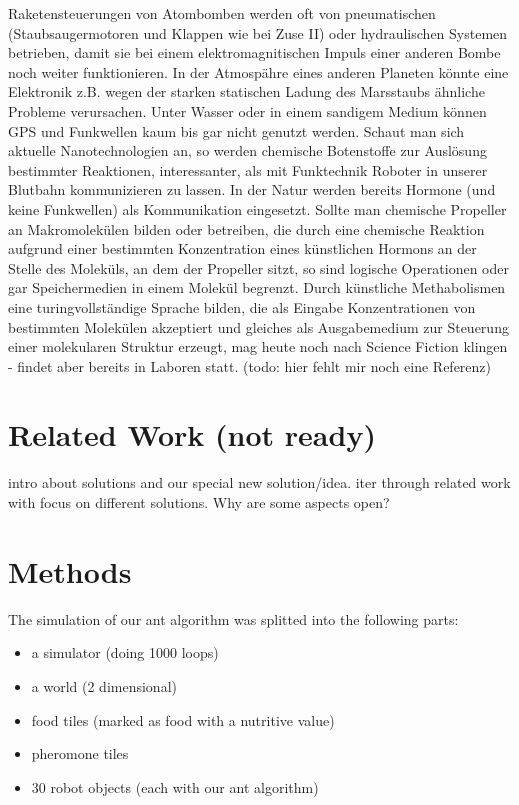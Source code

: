 Raketensteuerungen von Atombomben werden oft von pneumatischen
(Staubsaugermotoren und Klappen wie bei Zuse II) oder hydraulischen
Systemen betrieben, damit sie bei einem elektromagnitischen Impuls einer
anderen Bombe noch weiter funktionieren. In der Atmospähre eines anderen
Planeten könnte eine Elektronik z.B. wegen der starken statischen Ladung
des Marsstaubs ähnliche Probleme verursachen. Unter Wasser oder in einem
sandigem Medium können GPS und Funkwellen kaum bis gar nicht genutzt
werden. Schaut man sich aktuelle Nanotechnologien an, so werden
chemische Botenstoffe zur Auslösung bestimmter Reaktionen,
interessanter, als mit Funktechnik Roboter in unserer Blutbahn
kommunizieren zu lassen. In der Natur werden bereits Hormone (und keine
Funkwellen) als Kommunikation eingesetzt. Sollte man chemische Propeller
an Makromolekülen bilden oder betreiben, die durch eine chemische
Reaktion aufgrund einer bestimmten Konzentration eines künstlichen
Hormons an der Stelle des Moleküls, an dem der Propeller sitzt, so sind
logische Operationen oder gar Speichermedien in einem Molekül begrenzt.
Durch künstliche Methabolismen eine turingvollständige Sprache bilden,
die als Eingabe Konzentrationen von bestimmten Molekülen akzeptiert und
gleiches als Ausgabemedium zur Steuerung einer molekularen Struktur
erzeugt, mag heute noch nach Science Fiction klingen - findet aber
bereits in Laboren statt. (todo: hier fehlt mir noch eine Referenz)

\section{Related Work (not ready)}\label{related-work-not-ready}

intro about solutions and our special new solution/idea. iter through
related work with focus on different solutions. Why are some aspects
open?

\section{Methods}\label{methods}

The simulation of our ant algorithm was splitted into the following
parts:

\begin{itemize}
\tightlist
\item
  a simulator (doing 1000 loops)
\item
  a world (2 dimensional)
\item
  food tiles (marked as food with a nutritive value)
\item
  pheromone tiles
\item
  30 robot objects (each with our ant algorithm)
\end{itemize}

